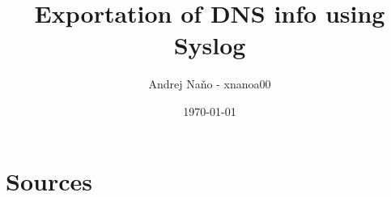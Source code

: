 \documentclass{report}
\title{Exportation of DNS info using Syslog}
\author{Andrej Naňo - xnanoa00}
\date{\today}
\begin{document}
\newpage
\maketitle
\newpage


\renewcommand{\contentsname}{Table of Content}
\tableofcontents









\section{Sources}
\label{bib}

\nocite{*}

\printbibliography[heading=none]
\end{document}
